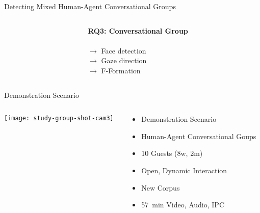 \begin{frame}{Detecting Mixed Human-Agent Conversational Groups}
  \centering
    \begin{columns}[T] %
      \begin{column}{.5\textwidth}
          \def\svgwidth{\textwidth}%
          
      \end{column}
      \begin{column}{.5\textwidth}
        \vspace{10pt}
        \textbf{RQ3: Conversational Group}\\\vspace{5pt} 
        \\
      \vspace{10pt}
       \(\rightarrow\) \hspace{5pt} Face detection\\
       \vspace{5pt}
       \(\rightarrow\) \hspace{5pt} Gaze direction\\
       \vspace{5pt}
       \(\rightarrow\) \hspace{5pt} F-Formation\\
      \end{column}
    \end{columns}
\end{frame}
\begin{frame}{Demonstration Scenario}
  \begin{columns}[T] %
    \begin{column}{.5\textwidth}
      \texttt{[image: study-group-shot-cam3]}
    \end{column}
    \begin{column}{.5\textwidth}
    \begin{itemize}[label=-]
      \item<1->[] Demonstration Scenario
      \item<1->[\(\rightarrow\)] Human-Agent Conversational Goups
      \item<2-> 10 Guests (8w, 2m) 
      \item<2->[\(\rightarrow\)] Open, Dynamic Interaction
      \item<3->[] \textcolor{mygreen}{New Corpus}
      \item<3-> \SI{57}{min} Video, Audio, IPC
    \end{itemize}
  \end{column}
  \end{columns}
  \vspace{10pt}
\end{frame}
